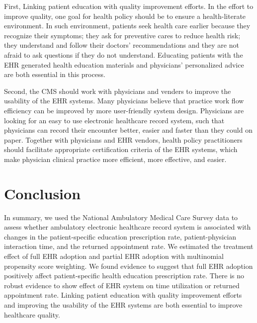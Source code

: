 \documentclass[12pt]{report}
\begin{document}
First, Linking patient education with quality improvement efforts. In the effort to improve quality, one goal for health policy should be to ensure a health-literate environment. In such environment, patients seek health care earlier because they recognize their symptoms; they ask for preventive cares to reduce health risk; they understand and follow their doctors' recommendations and they are not afraid to ask questions if they do not understand. Educating patients with the EHR generated health education materials and physicians' personalized advice are both essential in this process. 

Second, the CMS should work with physicians and venders to improve the usability of the EHR systems. Many physicians believe that practice work flow efficiency can be improved by more user-friendly system design. Physicians are looking for an easy to use electronic healthcare record system, such that physicians can record their encounter better, easier and faster than they could on paper. Together with physicians and EHR vendors, health policy practitioners should facilitate appropriate certification criteria of the EHR systems, which make physician clinical practice more efficient, more effective, and easier. 

\chapter{Conclusion}
In summary, we used the National Ambulatory Medical Care Survey data to assess whether ambulatory electronic healthcare record system is associated with changes in the patient-specific education prescription rate, patient-physician interaction time, and the returned appointment rate. We estimated the treatment effect of full EHR adoption and partial EHR adoption with multinomial propensity score weighting. We found evidence to suggest that full EHR adoption positively affect patient-specific health education prescription rate. There is no robust evidence to show effect of EHR system on time utilization or returned appointment rate. Linking patient education with quality improvement efforts and improving the usability of the EHR systems are both essential to improve healthcare quality.

\newpage


\end{document}
